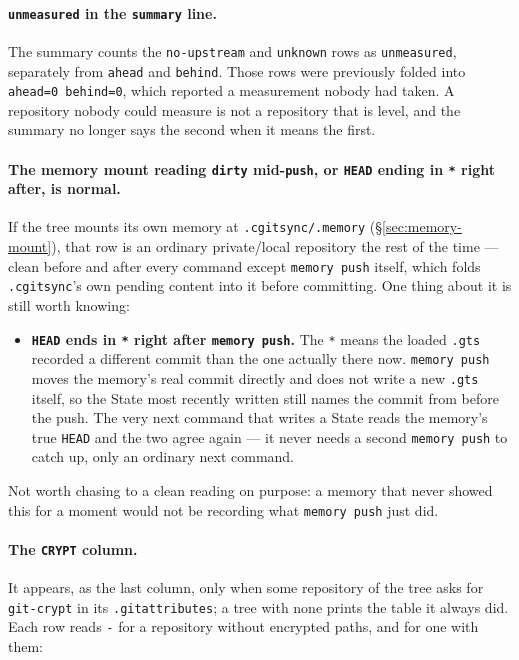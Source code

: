 \paragraph{\texttt{unmeasured} in the \texttt{summary} line.} The summary
counts the \texttt{no-upstream} and \texttt{unknown} rows as
\texttt{unmeasured}, separately from \texttt{ahead} and \texttt{behind}.
Those rows were previously folded into \texttt{ahead=0 behind=0}, which
reported a measurement nobody had taken. A repository nobody could measure
is not a repository that is level, and the summary no longer says the
second when it means the first.

\paragraph{The memory mount reading \texttt{dirty} mid-\texttt{push}, or
\texttt{HEAD} ending in \texttt{*} right after, is normal.} If the tree
mounts its own memory at \texttt{.cgitsync/.memory}
(\S\ref{sec:memory-mount}), that row is an ordinary private/local
repository the rest of the time --- clean before and after every command
except \texttt{memory push} itself, which folds \texttt{.cgitsync}'s own
pending content into it before committing. One thing about it is still
worth knowing:

\begin{itemize}
  \item \textbf{\texttt{HEAD} ends in \texttt{*} right after
        \texttt{memory push}.} The \texttt{*} means the loaded \texttt{.gts}
        recorded a different commit than the one actually there now.
        \texttt{memory push} moves the memory's real commit directly and
        does not write a new \texttt{.gts} itself, so the State most
        recently written still names the commit from before the push. The
        very next command that writes a State reads the memory's true
        \texttt{HEAD} and the two agree again --- it never needs a second
        \texttt{memory push} to catch up, only an ordinary next command.
\end{itemize}

Not worth chasing to a clean reading on purpose: a memory that never
showed this for a moment would not be recording what \texttt{memory push}
just did.

\paragraph{The \texttt{CRYPT} column.} It appears, as the last column, only
when some repository of the tree asks for \texttt{git-crypt} in its
\texttt{.gitattributes}; a tree with none prints the table it always did.
Each row reads \texttt{-} for a repository without encrypted paths, and for
one with them:


